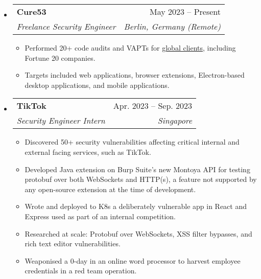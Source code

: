 \documentclass[letterpaper,10pt]{article}
\makeatletter
\newcommand{\link}[2]{\href{#1}{\color{blue}\underline{#2}}}
\newcommand{\resumeItem}[1]{
  \item\small{
    {#1 \vspace{-2pt}}
  }
}
\newcommand{\resumeSubheading}[4]{
  \vspace{-2pt}\item
  \begin{tabular*}{0.97\textwidth}[t]{l@{\extracolsep{\fill}}r}
    \textbf{#1} & #2 \\
    \textit{\small#3} & \textit{\small #4} \\
  \end{tabular*}\vspace{-7pt}
}
\newenvironment{resumeSubHeadingList}{\begin{itemize}[leftmargin=0.15in, label={}]}{\end{itemize}}
\newenvironment{resumeItemList}{\begin{itemize}}{\end{itemize}}
\makeatother
\begin{document}
\begin{resumeSubHeadingList}
  \resumeSubheading
    {Cure53}{May 2023 -- Present}
    {Freelance Security Engineer}{Berlin, Germany (Remote)}
    \begin{resumeItemList}
      \resumeItem{Performed 20+ code audits and VAPTs for \link{https://cure53.de/\#publications}{global clients}, including Fortune 20
       companies.}
      \resumeItem{Targets included web applications, browser extensions,
                  Electron-based desktop applications, and mobile
                  applications.} \end{resumeItemList}

  \resumeSubheading
    {TikTok}{Apr. 2023 -- Sep. 2023}
    {Security Engineer Intern}{Singapore}
    \begin{resumeItemList}
      \resumeItem{Discovered 50+ security vulnerabilities affecting critical
                  internal and external facing services, such as TikTok.}
      \resumeItem{Developed Java extension on Burp Suite's new Montoya API for
                  testing protobuf over both WebSockets and HTTP(s), a feature
                  not supported by any open-source extension at the time of
                  development.}
      \resumeItem{Wrote and deployed to K8s a deliberately vulnerable app in
                  React and Express used as part of an internal competition.}
      \resumeItem{Researched at scale: Protobuf over WebSockets, XSS filter
                  bypasses, and rich text editor vulnerabilities.}
      \resumeItem{Weaponised a 0-day in an online word processor to harvest
                  employee credentials in a red team operation.}
    \end{resumeItemList}
\end{resumeSubHeadingList}

\end{document}
